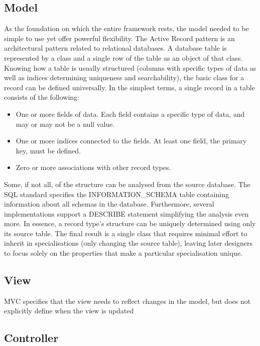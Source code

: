 \subsection{Model}
As the foundation on which the entire framework rests, the model needed to be simple to use yet offer powerful flexibility. The Active Record pattern is an architectural pattern related to relational databases. A database table is represented by a class and a single row of the table as an object of that class. Knowing how a table is usually structured (columns with specific types of data as well as indices determining uniqueness and searchability), the basic class for a record can be defined universally.
In the simplest terms, a single record in a table consists of the following:
\begin{itemize}
    \item One or more fields of data. Each field contains a specific type of data, and may or may not be a null value.
    \item One or more indices connected to the fields. At least one field, the primary key, must be defined.
    \item Zero or more associations with other record types.
\end{itemize}
Some, if not all, of the structure can be analysed from the source database. The SQL standard specifies the INFORMATION\_SCHEMA table containing information about all schemas in the database. Furthermore, several implementations support a DESCRIBE statement simplifying the analysis even more. In essence, a record type's structure can be uniquely determined using only its source table.
The final result is a single class that requires minimal effort to inherit in specialisations (only changing the source table), leaving later designers to focus solely on the properties that make a particular specialisation unique.

\subsection{View}
MVC specifies that the view needs to reflect changes in the model, but does not explicitly define when the view is updated

\subsection{Controller}
